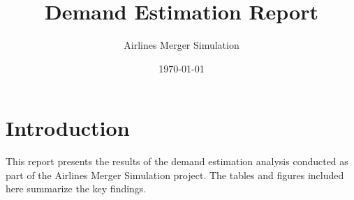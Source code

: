 \documentclass{article}
\title{Demand Estimation Report}
\author{Airlines Merger Simulation}
\date{\today}
\begin{document}
\maketitle



\section{Introduction}
This report presents the results of the demand estimation analysis conducted as part of the Airlines Merger Simulation project. The tables and figures included here summarize the key findings.
\end{document}
